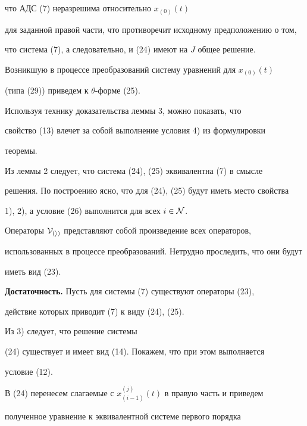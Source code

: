 \begin{pf}
что АДС (7) неразрешима относительно $x_{(0)}(t)$


для заданной правой части, что противоречит исходному предположению о том,


что система (7), а следовательно, и (24) имеют на $J$ общее решение.





Возникшую в процессе преобразований систему уравнений для $x_{(0)}(t)$


(типа (29)) приведем к $\theta$-форме (25).


Используя технику доказательства леммы 3, можно показать, что


свойство (13) влечет за собой выполнение условия 4) из формулировки


теоремы.





Из леммы 2 следует, что система (24), (25) эквивалентна (7) в смысле


решения. По построению ясно, что для (24), (25) будут иметь место свойства


1), 2), а условие (26) выполнится для всех $i \in \cal N $.





Операторы $\cal V_{(i)}$ представляют собой произведение всех операторов,


использованных в процессе преобразований. Нетрудно проследить, что они будут


иметь вид (23).


\medskip





{\bf Достаточность.} Пусть для системы (7) существуют операторы (23),


действие которых приводит (7) к виду (24), (25).


Из 3) следует, что решение системы


(24) существует и имеет вид (14). Покажем, что при этом выполняется


условие (12).





В (24) перенесем слагаемые с $x_{(i-1)}^{(j)}(t)$ в правую часть и приведем


полученное уравнение к эквивалентной системе первого порядка


\begin{equation}



\end{equation}
\end{pf}
